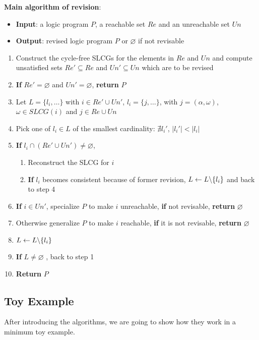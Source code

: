     \textbf{Main algorithm of revision}:
    \begin{itemize}
        \item \textbf{Input}: a logic program $P$, a reachable set $Re$ and an unreachable set $Un$
        \item \textbf{Output}: revised logic program $P$ or $\varnothing$ if not revisable
    \end{itemize}
    \begin{enumerate}
        \item Construct the cycle-free SLCGs for the elements in $Re$ and $Un$ and compute unsatisfied sets $Re'\subseteq Re$ and $Un'\subseteq Un$ which are to be revised
        \item \textbf{If} $Re'=\varnothing$ and $Un'=\varnothing$, \textbf{return} $P$
        \item Let $L=\{l_i,\ldots\}$ with $i\in Re' \cup Un'$, $l_i=\{j,\ldots\}$, with $j=(\alpha,\omega)$, $\omega \in SLCG(i)$ and $ j\in Re\cup Un$ \label{step:dependency}
        \item Pick one of $l_i\in L$ of the smallest cardinality: $\nexists l_i'$, $|l_i'| < |l_i|$ \label{step:cardinality}
        \item \textbf{If} $l_i\cap (Re'\cup Un')\neq\varnothing$, \label{step:check}
        \begin{enumerate}
            \item Reconstruct the SLCG for $i$
            \item \textbf{If} $l_i$ becomes consistent because of former revision, $L\gets L\miset{l_i}$ and back to step 4
        \end{enumerate}
        \item \textbf{If} $i\in Un'$, specialize $P$ to make $i$ unreachable, \textbf{if} not revisable, \textbf{return} $\varnothing$ \label{step:specialize}
        \item Otherwise generalize $P$ to make $i$ reachable, \textbf{if} it is not revisable, \textbf{return} $\varnothing$ \label{step:generalize}
        
        \item $L\gets L\miset{l_i}$ \label{step:update}
        \item \textbf{If} $L\neq\varnothing$ , back to step 1 \label{step:recheck}
        \item \textbf{Return} $P$
    \end{enumerate} 
    
\subsection{Toy Example}    
After introducing the algorithms, we are going to show how they work in a minimum toy example.

